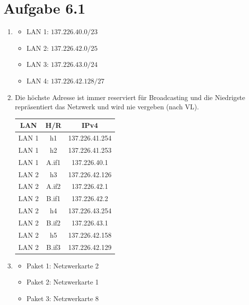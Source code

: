 \documentclass[12pt, a4paper]{article}
\begin{document}
\section*{Aufgabe 6.1}
\begin{enumerate}[label=\alph*)]
	\item	\begin{itemize}
				\item	LAN 1: $137.226.40.0/23$
				\item	LAN 2: $137.226.42.0/25$
				\item	LAN 3: $137.226.43.0/24$
				\item	LAN 4: $137.226.42.128/27$
			\end{itemize}
	\item	Die höchste Adresse ist immer reserviert für Broadcasting und die Niedrigste repräsentiert das Netzwerk und wird nie vergeben (nach VL).\\
			
			\begin{center}\begin{tabular}{c|c|c}
				LAN & H/R & IPv4 \\
				\hline\hline
				LAN 1 & h1 & 137.226.41.254 \\
				LAN 1 & h2 & 137.226.41.253 \\
				LAN 1 & A.if1 & 137.226.40.1 \\
				\hline
				LAN 2 & h3 & 137.226.42.126 \\
				LAN 2 & A.if2 & 137.226.42.1 \\
				LAN 2 & B.if1 & 137.226.42.2 \\
				\hline
				LAN 2 & h4 & 137.226.43.254 \\
				LAN 2 & B.if2 & 137.226.43.1 \\
				\hline
				LAN 2 & h5 & 137.226.42.158 \\
				LAN 2 & B.if3 & 137.226.42.129 \\
			
			\end{tabular}\end{center}
	\item	\begin{itemize}
				\item	Paket 1: Netzwerkarte 2
				\item	Paket 2: Netzwerkarte 1
				\item	Paket 3: Netzwerkarte 8
			\end{itemize}
\end{enumerate}
\end{document}
